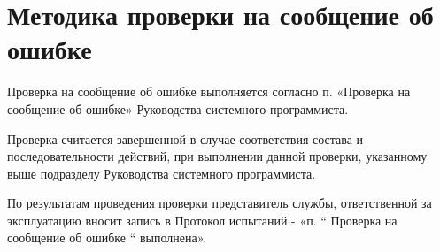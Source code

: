 \documentclass[14pt,a4paper,final]{extreport}
\begin{document}
\section{Методика проверки на сообщение об ошибке}
Проверка на сообщение об ошибке выполняется согласно п. «Проверка на сообщение об ошибке» Руководства системного программиста.

Проверка считается завершенной в случае соответствия состава и последовательности действий, при выполнении данной проверки, указанному выше подразделу Руководства системного программиста.

По результатам проведения проверки представитель службы, ответственной за эксплуатацию вносит запись в Протокол испытаний - «п. “ Проверка на сообщение об ошибке “ выполнена».


\pagebreak

\label{lastpage}
\end{document}
